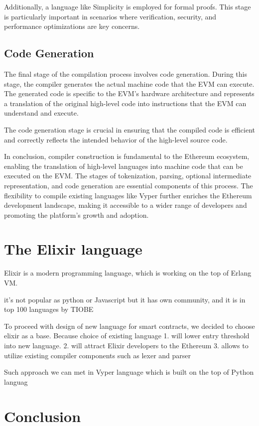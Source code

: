 Additionally, a language like Simplicity is employed for formal proofs. This stage is particularly important in scenarios where verification, security, and performance optimizations are key concerns.

\subsection{Code Generation}

The final stage of the compilation process involves code generation. During this stage, the compiler generates the actual machine code that the EVM can execute. The generated code is specific to the EVM's hardware architecture and represents a translation of the original high-level code into instructions that the EVM can understand and execute.

The code generation stage is crucial in ensuring that the compiled code is efficient and correctly reflects the intended behavior of the high-level source code.


In conclusion, compiler construction is fundamental to the Ethereum ecosystem, enabling the translation of high-level languages into machine code that can be executed on the EVM. The stages of tokenization, parsing, optional intermediate representation, and code generation are essential components of this process. The flexibility to compile existing languages like Vyper further enriches the Ethereum development landscape, making it accessible to a wider range of developers and promoting the platform's growth and adoption.

\section{The Elixir language}

Elixir is a modern programming language, which is working on the top of Erlang VM.

it's not popular as python or Javascript but it has own community, and it is in top 100 languages by TIOBE \cite{TIOBE}

To proceed with design of new language for smart contracts, we decided to choose elixir as a base. Because choice of existing language
1. will lower entry threshold into new language.
2. will attract Elixir developers to the Ethereum
3. allows to utilize existing compiler components such as lexer and parser

Such approach we can met in Vyper language which is built on the top of Python languag
\section{Conclusion}



